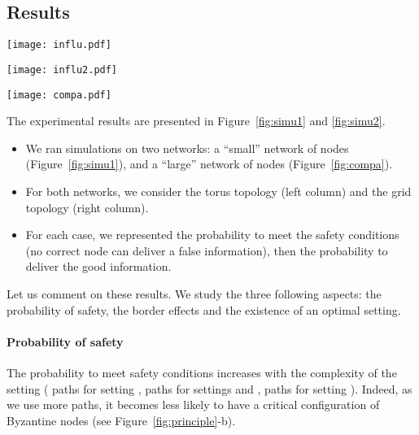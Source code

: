 \documentclass[a4paper,11pt]{article}
\begin{document}
\subsection{Results}

\begin{figure*}
\begin{center}
\texttt{[image: influ.pdf]}
\caption{Simulation results on a  network} 
\label{fig:simu1}
\end{center}
\end{figure*}

\begin{figure*}
\begin{center}
\texttt{[image: influ2.pdf]}
\caption{Simulation results on a  network} 
\label{fig:simu2}
\end{center}
\end{figure*}

\begin{figure*}
\begin{center}
\texttt{[image: compa.pdf]}
\caption{Experimental comparison of existing protocols on a logarithmic scale} 
\label{fig:compa}
\end{center}
\end{figure*}

The experimental results are presented in Figure~\ref{fig:simu1} and \ref{fig:simu2}. 
\begin{itemize}
\item We ran simulations on two networks: a ``small'' network of  nodes (Figure~\ref{fig:simu1}), and a ``large'' network of  nodes (Figure~\ref{fig:compa}).
\item For both networks, we consider the torus topology (left column) and the grid topology (right column).
\item For each case, we represented the probability to meet the safety conditions (no correct node can deliver a false information), then the probability  to deliver the good information.
\end{itemize}


Let us comment on these results. We study the three following aspects: the probability of safety, the border effects and the existence of an optimal setting.

\paragraph{Probability of safety}

The probability to meet safety conditions increases with the complexity of the setting ( paths for setting ,  paths for settings  and ,  paths for setting ). Indeed, as we use more paths, it becomes less likely to have a critical configuration of Byzantine nodes (see Figure~\ref{fig:principle}-b).
\end{document}
